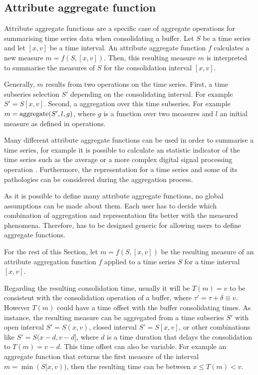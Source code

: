 \subsection{Attribute aggregate function}
\label{sec:model:interpolador}



Attribute aggregate functions are a specific case of 
aggregate operations for summarising time series data when
consolidating a buffer. Let $S$ be a time series and let $[x,v]$ be a
time interval. An attribute aggregate function $f$ calculates a new
measure $m=f(S,[x,v])$. Then, this resulting measure $m$ is interpreted to
summarise the measures of $S$ for the consolidation interval $[x,v]$.



Generally, $m$ results from two operations on the time series.  First,
a time subseries selection $S'$ depending on the consolidating
interval. For example $S' = S[x,v]$. Second, a  aggregation
over this time subseries. For example $m = \operatorname*{aggregate}(S',l, g)$, where $g$
is a function over two measures and $l$ an initial measure as defined
in  operations.


Many different attribute aggregate functions can be used in order to
summarise a time series, for example it is possible to calculate an
statistic indicator of the time series such as the average or a more
complex digital signal processing operation
\cite{zhang11}. Furthermore, the representation for a time series and
some of its pathologies can be considered during the aggregation
process.


As it is possible to define many attribute aggregate
functions, no global assumptions can be made about them. Each user has
to decide which combination of aggregation and representation fits
better with the measured phenomena.  Therefore,  has to be
designed generic for allowing users to define aggregate functions.


For the rest of this Section, let $m=f(S,[x,v])$ be the resulting
measure of an attribute aggregation function $f$ applied to a time
series $S$ for a time interval $[x,v]$.

Regarding the resulting consolidation time, usually it will be
$T(m)=v$ to be consistent with the consolidation operation of a
buffer, where $\tau' = \tau + \delta \equiv v$. However $T(m)$ could
have a time offset with the buffer consolidating times. As instance,
the resulting measure can be aggregated from a time subseries $S'$
with open interval $S'=S(x,v)$, closed interval $S'=S[x,v]$, or other
combinations like $S'=S(x-d,v-d]$, where $d$ is a time duration that
delays the consolidation to $T(m)=v-d$.  This time offset can also be
variable. For example an aggregate function that returns the first
measure of the interval $m=\min(S[x,v))$, then the resulting
time can be between $x \leq T(m) < v$.


